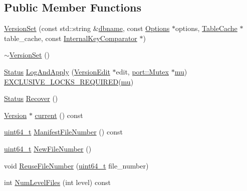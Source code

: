 \subsection*{Public Member Functions}
\begin{DoxyCompactItemize}
\item 
\hyperlink{classleveldb_1_1_version_set_a9e57cec002caced94f5355bb705bd52d}{Version\-Set} (const std\-::string \&\hyperlink{c__test_8c_a75d845559336df6843f3b599960f89d2}{dbname}, const \hyperlink{structleveldb_1_1_options}{Options} $\ast$options, \hyperlink{classleveldb_1_1_table_cache}{Table\-Cache} $\ast$table\-\_\-cache, const \hyperlink{classleveldb_1_1_internal_key_comparator}{Internal\-Key\-Comparator} $\ast$)
\item 
\hyperlink{classleveldb_1_1_version_set_a53a424c5bb7699808193f150e3432e92}{$\sim$\-Version\-Set} ()
\item 
\hyperlink{classleveldb_1_1_status}{Status} \hyperlink{classleveldb_1_1_version_set_ac1d014901be7095ace1aaec0cf391fb6}{Log\-And\-Apply} (\hyperlink{classleveldb_1_1_version_edit}{Version\-Edit} $\ast$edit, \hyperlink{classleveldb_1_1port_1_1_mutex}{port\-::\-Mutex} $\ast$\hyperlink{db__impl_8cc_a900dad9ea326bf70a183d88a8ab50a13}{mu}) \hyperlink{thread__annotations_8h_a0e2e86b0f11d9778240b0a0b263047b1}{E\-X\-C\-L\-U\-S\-I\-V\-E\-\_\-\-L\-O\-C\-K\-S\-\_\-\-R\-E\-Q\-U\-I\-R\-E\-D}(\hyperlink{db__impl_8cc_a900dad9ea326bf70a183d88a8ab50a13}{mu})
\item 
\hyperlink{classleveldb_1_1_status}{Status} \hyperlink{classleveldb_1_1_version_set_a955ff8620ec56742cdc48da0e74ab40b}{Recover} ()
\item 
\hyperlink{classleveldb_1_1_version}{Version} $\ast$ \hyperlink{classleveldb_1_1_version_set_a500747b987e66c51116287f26cfd028c}{current} () const 
\item 
\hyperlink{stdint_8h_aaa5d1cd013383c889537491c3cfd9aad}{uint64\-\_\-t} \hyperlink{classleveldb_1_1_version_set_a1e0d9925a9d909345ede866b9c504750}{Manifest\-File\-Number} () const 
\item 
\hyperlink{stdint_8h_aaa5d1cd013383c889537491c3cfd9aad}{uint64\-\_\-t} \hyperlink{classleveldb_1_1_version_set_ac4086c848479e74c1d9eb95e250e7167}{New\-File\-Number} ()
\item 
void \hyperlink{classleveldb_1_1_version_set_a8131cebf5be3283e2ce1029e8be0d14e}{Reuse\-File\-Number} (\hyperlink{stdint_8h_aaa5d1cd013383c889537491c3cfd9aad}{uint64\-\_\-t} file\-\_\-number)
\item 
int \hyperlink{classleveldb_1_1_version_set_a29d2d4a5aa83c12a1451743ca2a570fa}{Num\-Level\-Files} (int level) const 

\end{DoxyCompactItemize}
